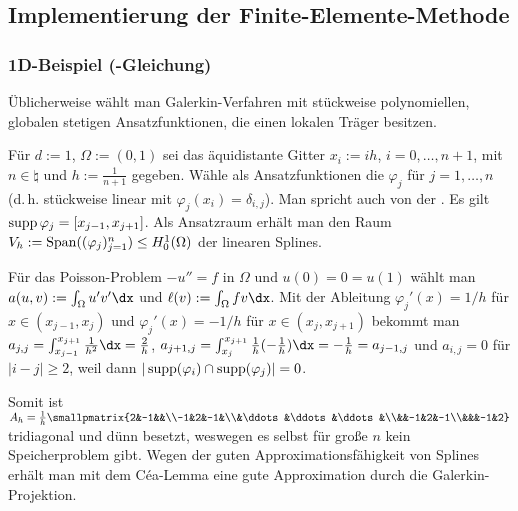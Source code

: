 \subsection{%
    Implementierung der Finite-Elemente-Methode%
}

\subsubsection{%
    1D-Beispiel (-Gleichung)%
}

\begin{Bem}
    Üblicherweise wählt man Galerkin-Verfahren mit
    stückweise polynomiellen, globalen stetigen Ansatzfunktionen, die einen lokalen Träger
    besitzen.
\end{Bem}

\begin{Bsp}
    Für $d := 1$, $\Omega := (0, 1)$
    sei das äquidistante Gitter
    $x_i := ih$, $i = 0, \dotsc, n + 1$, mit $n \in \natural$ und $h := \frac{1}{n+1}$ gegeben.
    Wähle als Ansatzfunktionen die 
    $\varphi_j$ für $j = 1, \dotsc, n$
    (d.\,h. stückweise linear mit $\varphi_j(x_i) = \delta_{i,j}$).
    Man spricht auch von der .
    Es gilt $\operatorname{supp}\varphi_j = [x_{j-1}, x_{j+1}]$.
    Als Ansatzraum erhält man den Raum $V_h := \operatorname{Span}((\varphi_j)_{j=1}^n) \le H^1_0(\Omega)$
    der linearen Splines.

    Für das Poisson-Problem $-u'' = f$ in $\Omega$ und $u(0) = 0 = u(1)$ wählt man
    $a(u, v) := \int_\Omega u'v'\dx$ und $\ell(v) := \int_\Omega fv\dx$.
    Mit der Ableitung $\varphi_j'(x) = 1/h$ für $x \in (x_{j-1}, x_j)$ und
    $\varphi_j'(x) = -1/h$ für $x \in (x_j, x_{j+1})$ bekommt man
    $a_{j,j} = \int_{x_{j-1}}^{x_{j+1}} \frac{1}{h^2} \dx = \frac{2}{h}$,
    $a_{j+1,j} = \int_{x_j}^{x_{j+1}} \frac{1}{h} (-\frac{1}{h}) \dx = -\frac{1}{h} = a_{j-1,j}$
    und $a_{i,j} = 0$ für $|i - j| \ge 2$, weil dann
    $|\operatorname{supp}(\varphi_i) \cap \operatorname{supp}(\varphi_j)| = 0$.

    Somit ist $A_h = \frac{1}{h}
    \smallpmatrix{2&-1&&\\-1&2&-1&\\&\ddots&\ddots&\ddots&\\&&-1&2&-1\\&&&-1&2}$
    tridiagonal und dünn besetzt,
    weswegen es selbst für große $n$ kein Speicherproblem gibt.
    Wegen der guten Approximationsfähigkeit von Splines erhält man mit dem
    Céa-Lemma eine gute Approximation durch die Galerkin-Projektion.
\end{Bsp}

